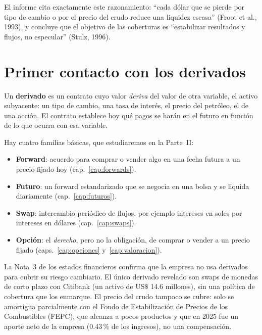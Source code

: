 \begin{informe}
El informe cita exactamente este razonamiento: \enquote{cada dólar que se pierde por tipo de cambio o por el precio del crudo reduce una liquidez escasa} (Froot et al., 1993), y concluye que el objetivo de las coberturas es \enquote{estabilizar resultados y flujos, no especular} (Stulz, 1996).
\end{informe}

\section{Primer contacto con los derivados}

\begin{definicion}
Un \textbf{derivado} es un contrato cuyo valor \emph{deriva} del valor de otra variable, el activo subyacente: un tipo de cambio, una tasa de interés, el precio del petróleo, el de una acción. El contrato establece hoy qué pagos se harán en el futuro en función de lo que ocurra con esa variable.
\end{definicion}

Hay cuatro familias básicas, que estudiaremos en la Parte~II:

\begin{itemize}
\item \textbf{Forward}: acuerdo para comprar o vender algo en una fecha futura a un precio fijado hoy (cap.~\ref{cap:forwards}).
\item \textbf{Futuro}: un forward estandarizado que se negocia en una bolsa y se liquida diariamente (cap.~\ref{cap:futuros}).
\item \textbf{Swap}: intercambio periódico de flujos, por ejemplo intereses en soles por intereses en dólares (cap.~\ref{cap:swaps}).
\item \textbf{Opción}: el \emph{derecho}, pero no la obligación, de comprar o vender a un precio fijado (caps.~\ref{cap:opciones} y~\ref{cap:valoracion}).
\end{itemize}

\begin{informe}
La Nota~3 de los estados financieros confirma que la empresa no usa derivados para cubrir su riesgo cambiario. El único derivado revelado son swaps de monedas de corto plazo con Citibank (un activo de US\$ 14.6 millones), sin una política de cobertura que los enmarque. El precio del crudo tampoco se cubre: solo se amortigua parcialmente con el Fondo de Estabilización de Precios de los Combustibles (FEPC), que alcanza a pocos productos y que en 2025 fue un aporte neto de la empresa (0.43\,\% de los ingresos), no una compensación.
\end{informe}

